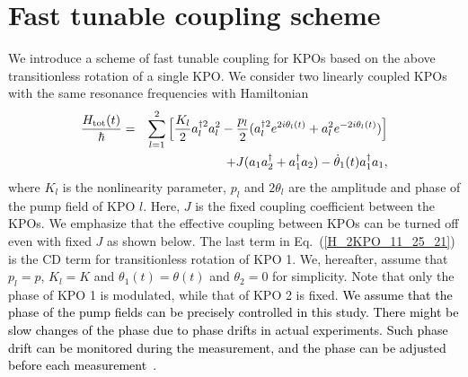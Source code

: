 \documentclass[%
 reprint,
 amsmath,amssymb,
 aps,
pra,
]{revtex4-2}
\begin{document}
\section{Fast tunable coupling scheme}
We introduce a scheme of fast tunable coupling for KPOs based on the above transitionless rotation of a single KPO. 
We consider two linearly coupled KPOs with the same resonance frequencies with Hamiltonian 
\begin{eqnarray}
\frac{H_{\rm tot}(t)}{\hbar} &=&  \sum_{l=1}^{2} \Big{[} \frac{K_l}{2}a_l^{\dagger 2} a_l^2 - \frac{p_l}{2} (a_l^{\dagger 2}e^{{2i\theta_l(t)}} + a_l^2e^{{-2i{\theta_l(t)}}}) \Big{]} \nonumber\\
&& + J (a_1a_2^\dagger + a_1^\dagger a_2)
-  \dot\theta_1(t) a_1^\dagger a_1,
\label{H_2KPO_11_25_21}
\end{eqnarray}
where $K_l$ is the nonlinearity parameter, $p_l$ and $2\theta_l$ are the amplitude and phase of the pump field of KPO $l$. Here, $J$ is the fixed coupling coefficient between the KPOs.
We emphasize that the effective coupling between KPOs can be turned off even with fixed $J$ as shown below.
The last term in Eq.~(\ref{H_2KPO_11_25_21}) is the CD term for transitionless rotation of KPO 1.
We, hereafter, assume that $p_l=p$, $K_l=K$ and $\theta_1(t)=\theta(t)$ and $\theta_2=0$ for simplicity.
Note that only the phase of KPO 1 is modulated, while that of KPO 2 is fixed.
\textcolor{black}{We assume that the phase of the pump fields can be precisely controlled in this study.
There might be slow changes of the phase due to phase drifts in actual experiments. Such phase drift can be monitored during the measurement, and the phase can be adjusted before each measurement~\cite{Wang2019}.}
\end{document}
